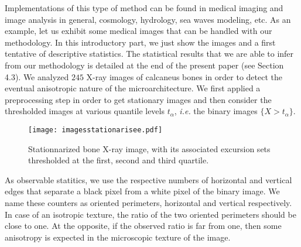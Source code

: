 \documentclass[12pt]{article}
\theoremstyle{Theorem}
\theoremstyle{definition}
\begin{document}
Implementations of this type of method can be found in medical imaging and image analysis in general, cosmology, hydrology, sea waves modeling, etc. As an example, let us exhibit some medical images that can be handled with our methodology. In this introductory part, we just show the images and a first tentative of descriptive statistics. The statistical results that we are able to infer from our methodology is detailed at the end of the present paper (see Section 4.3). 
We analyzed $245$ X-ray images of calcaneus bones in order to detect the eventual anisotropic nature of the microarchitecture.
We first applied a preprocessing step in order to get stationary images 
and then 
consider the thresholded images at various quantile levels $t_{\alpha}$, \emph{i.e.} the binary images $\{X > t_{\alpha}\}$.
\begin{figure}[H]
\centering
{\texttt{[image: imagesstationarisee.pdf]}}
 \caption{Stationnarized bone X-ray image, with its associated excursion sets thresholded at the first, second and third quartile.}
\label{fig22}
\end{figure}
As observable statitics, we use 
the respective numbers of horizontal and vertical edges that separate a black pixel from a white pixel of the binary image. We name these counters as oriented perimeters, horizontal and vertical respectively. In case of an isotropic texture, the ratio of the two oriented perimeters should be close to one. At the opposite, if the observed ratio is far from one, then some anisotropy is expected in the microscopic texture of the image. 
\end{document}

